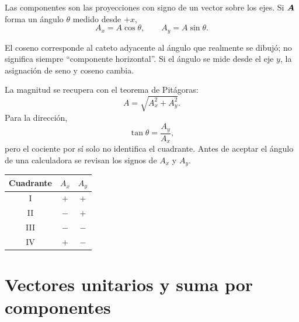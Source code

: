 \documentclass[11pt]{article}
\begin{document}
Las componentes son las proyecciones con signo de un vector sobre los ejes. Si
\(\boldsymbol{A}\) forma un ángulo \(\theta\) medido desde \(+x\),
\[
  A_x=A\cos\theta,
  \qquad
  A_y=A\sin\theta.
\]

\begin{center}
\end{center}

El coseno corresponde al cateto adyacente al ángulo que realmente se dibujó;
no significa siempre ``componente horizontal''. Si el ángulo se mide desde el
eje \(y\), la asignación de seno y coseno cambia.

La magnitud se recupera con el teorema de Pitágoras:
\[
  A=\sqrt{A_x^2+A_y^2}.
\]
Para la dirección,
\[
  \tan\theta=\frac{A_y}{A_x},
\]
pero el cociente por sí solo no identifica el cuadrante. Antes de aceptar el
ángulo de una calculadora se revisan los signos de \(A_x\) y \(A_y\).

\begin{center}
\begin{tabular}{c@{\qquad}cc}
\toprule
Cuadrante & \(A_x\) & \(A_y\) \\
\midrule
I   & \(+\) & \(+\) \\
II  & \(-\) & \(+\) \\
III & \(-\) & \(-\) \\
IV  & \(+\) & \(-\) \\
\bottomrule
\end{tabular}
\end{center}

\section{Vectores unitarios y suma por componentes}
\end{document}
